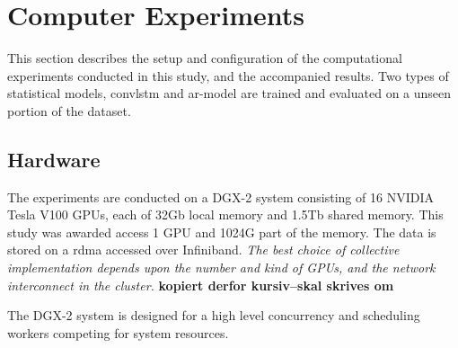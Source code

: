 \chapter{Computer Experiments} \label{ch:computer_experiments}
This section describes the setup and configuration of the computational experiments conducted in this study, and the accompanied results. Two types of statistical models, \acrshort{convlstm} and \acrshort{ar}-model are trained and evaluated on a unseen portion of the dataset. 

\section{Hardware} \label{sec:hardware}
The experiments are conducted on a 
DGX-2 system consisting of 16 NVIDIA Tesla V100 GPUs, each of 32Gb local memory and 1.5Tb shared memory. %
This study was awarded access 1 GPU and 1024G part of the memory. The data is stored on a \acrfull{rdma} accessed over Infiniband. \textit{The best choice of collective implementation depends upon the number and kind of GPUs, and the network interconnect in the cluster.} \textbf{kopiert derfor kursiv--skal skrives om} %

The DGX-2 system is designed for a high level concurrency and scheduling workers competing for system resources. %

